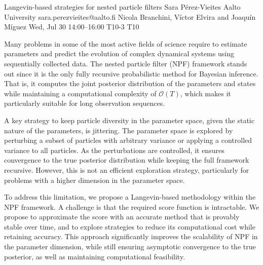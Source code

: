 \begin{talk}
  {Langevin-based strategies for nested particle filters}%
  {Sara Pérez-Vieites}%
  {Aalto University}%
  {sara.perezvieites@aalto.fi}%
  {Nicola Branchini, Víctor Elvira and Joaquín Míguez}%
  {}%
  {Wed, Jul 30 14:00–16:00}%
  {T10-3}%
  {T10}%
  
				
			
Many problems in some of the most active fields of science require to estimate parameters and predict the evolution of complex dynamical systems using sequentially collected data. The nested particle filter (NPF) framework stands out since it is the only fully recursive probabilistic method for Bayesian inference. That is, it computes the joint posterior distribution of the parameters and states while maintaining a computational complexity of $\mathcal{O}(T)$, which makes it particularly suitable for long observation sequences. 

A key strategy to keep particle diversity in the parameter space, given the static nature of the parameters, is jittering. The parameter space is explored by perturbing a subset of particles with arbitrary variance or applying a controlled variance to all particles. As the perturbations are controlled, it ensures convergence to the true posterior distribution while keeping the full framework recursive. However, this is not an efficient exploration strategy, particularly for problems with a higher dimension in the parameter space.

To address this limitation, we propose a Langevin-based methodology within the NPF framework. A challenge is that the required score function is intractable. We propose to approximate the score with an accurate method that is provably stable over time, and to explore strategies to reduce its computational cost while retaining accuracy.
This approach significantly improves the scalability of NPF in the parameter dimension, while still ensuring asymptotic convergence to the true posterior, as well as maintaining computational feasibility.

\medskip



\end{talk}

